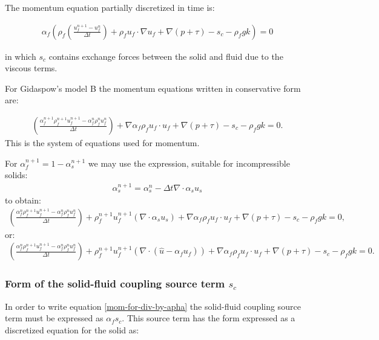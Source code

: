 The momentum equation partially discretized in time is:

\begin{eqnarray}
\alpha_f ( \rho_f (\frac{u_f^{n+1}-u_f^n}{\Delta t})
+ \rho_f u_f\cdot \nabla u_f 
+\nabla (p+\tau)  -s_c -\rho_f g k)=0
\label{mom-for-div-by-apha}
\end{eqnarray}

in which $s_c$ contains exchange forces between the 
solid and fluid due to the viscous terms. 

For Gidaspow's model B the momentum equations written in conservative form are: 

\begin{eqnarray}
(\frac{\alpha_f^{n+1} \rho_f^{n+1} u_f^{n+1}-\alpha_f^{n} \rho_f^{n} u_f^n}{\Delta t})
+ \nabla \alpha_f \rho_f u_f\cdot u_f 
+\nabla (p+\tau)  -s_c -\rho_f g k=0. 
\label{mom-for-div-by-apha-modelB}
\end{eqnarray}
This is the system of equations used for momentum. 

For $\alpha_f^{n+1}=1-\alpha_s^{n+1}$ we may use the expression, suitable for incompressible solids: 
\begin{eqnarray}
\alpha_s^{n+1}= \alpha_s^{n} - \Delta t \nabla \cdot \alpha_s u_s
\end{eqnarray}
to obtain: 
\begin{eqnarray}
(\frac{\alpha_f^{n} \rho_f^{n+1} u_f^{n+1}-\alpha_f^{n} \rho_f^{n} u_f^n}{\Delta t})
+\rho_f^{n+1} u_f^{n+1} (\nabla \cdot \alpha_s u_s) 
+ \nabla \alpha_f \rho_f u_f\cdot u_f 
+\nabla (p+\tau)  -s_c -\rho_f g k=0, 
\label{mom-for-div-by-apha-modelB-with-grad}
\end{eqnarray}
or: 
\begin{eqnarray}
(\frac{\alpha_f^{n} \rho_f^{n+1} u_f^{n+1}-\alpha_f^{n} \rho_f^{n} u_f^n}{\Delta t})
+\rho_f^{n+1} u_f^{n+1} (\nabla \cdot (\hat u - \alpha_f u_f)) 
+ \nabla \alpha_f \rho_f u_f\cdot u_f 
+\nabla (p+\tau)  -s_c -\rho_f g k=0. 
\label{mom-for-div-by-apha-modelB-with-grad-or}
\end{eqnarray}

\subsubsection{Form of the solid-fluid coupling source term $s_c$}
In order to write equation \ref{mom-for-div-by-apha} 
the solid-fluid coupling source term must be expressed 
as $\alpha_f s_c$. 
This source term has the form expressed as a discretized equation 
for the solid as: 

